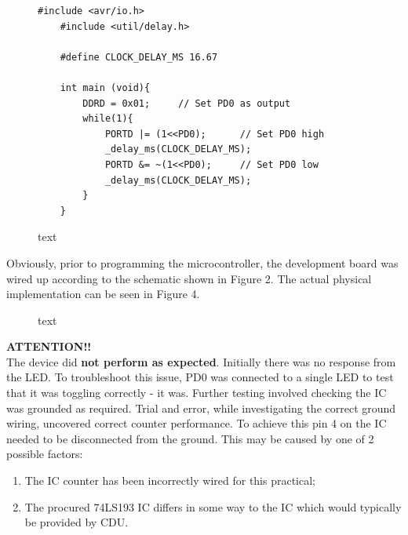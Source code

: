 \documentclass[a4paper]{article}
\begin{document}
\begin{figure}[h]
	\begin{lstlisting}[style=CStyle]
	#include <avr/io.h>
	#include <util/delay.h>
	
	#define CLOCK_DELAY_MS 16.67
	
	int main (void){
		DDRD = 0x01;     // Set PD0 as output
		while(1){
			PORTD |= (1<<PD0);		// Set PD0 high
			_delay_ms(CLOCK_DELAY_MS);
			PORTD &= ~(1<<PD0);		// Set PD0 low
			_delay_ms(CLOCK_DELAY_MS);
		}
	}
	\end{lstlisting}
	\caption{text}
\end{figure}

Obviously, prior to programming the microcontroller, the development board was wired up according to the schematic shown in Figure 2. The actual physical implementation can be seen in Figure 4.\\

\begin{figure}[h]
	\centering
	\caption{text}
\end{figure}

\begin{tcolorbox}
	\textbf{ATTENTION!!}\\
	
	The device did \textbf{not perform as expected}. Initially there was no response from the LED. To troubleshoot this issue, PD0 was connected to a single LED to test that it was toggling correctly - it was. Further testing involved checking the IC was grounded as required. Trial and error, while investigating the correct ground wiring, uncovered correct counter performance. To achieve this pin 4 on the IC needed to be disconnected from the ground. This may be caused by one of 2 possible factors:
	\begin{enumerate}
		\item The IC counter has been incorrectly wired for this practical;
		\item The procured 74LS193 IC differs in some way to the IC which would typically be provided by CDU. 
	\end{enumerate}
\end{tcolorbox}
\end{document}
